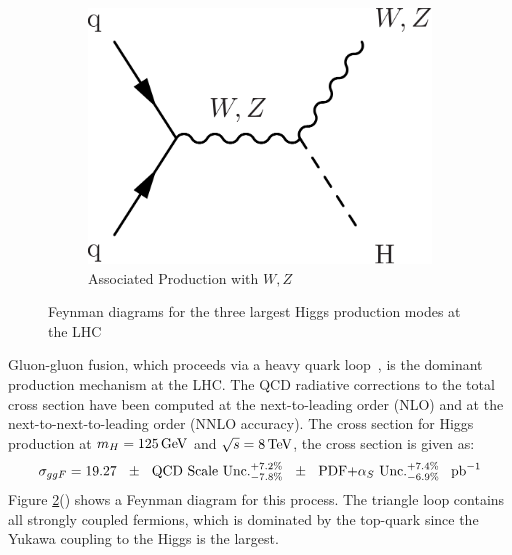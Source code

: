 \begin{figure}
      ~ %
      \begin{subfigure}[h]{0.3\textwidth}
        \includegraphics[width=\textwidth]{Figures/Feynman_Diagrams/higgs_production__vh.pdf}
        \caption{Associated Production with $W,Z$}\label{fig:higgs_production_vh}
      \end{subfigure}
      \caption{Feynman diagrams for the three largest Higgs production
        modes at the LHC} \label{fig:feynman_diagrams__higgs_production}
\end{figure}

\par Gluon-gluon fusion, which proceeds via a heavy quark
loop~\cite{th:HiggsXS_2013}, is the dominant production mechanism at
the LHC.  The QCD radiative corrections to the total cross section have been computed
at the next-to-leading order (NLO) and at the next-to-next-to-leading order (NNLO
accuracy).  The cross section for Higgs production at $m_{H} =
125\,\text{Ge\hspace{-.08em}V}$ and $\sqrt{s}=8\,\text{Te\hspace{-.08em}V}$, the cross section is given as:
\begin{equation}\label{eq:ggf_xs}
\sigma_{ggF} = 19.27~~\pm \text{~~QCD Scale Unc.}^{+7.2\%}_{-7.8\%}~~\pm
\text{~~PDF+$\alpha_{S}$ Unc.}^{+7.4\%}_{-6.9\%}~~\mbox{\ensuremath{\,\text{pb}^\text{$-$1}}}
\end{equation}
\noindent Figure \ref{fig:feynman_diagrams__higgs_production}() shows a Feynman
diagram for this process.  The triangle loop contains all strongly
coupled fermions, which is dominated by the top-quark since the
Yukawa coupling to the Higgs is the largest.  

